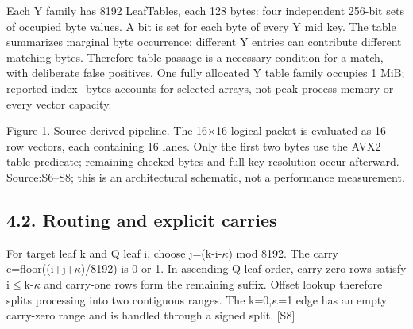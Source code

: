 \documentclass[10pt,letterpaper]{article}
\begin{document}
Each Y family has 8192 LeafTables, each 128 bytes: four independent 256-bit sets of occupied byte values. A bit is set for each byte of every Y mid key. The table summarizes marginal byte occurrence; different Y entries can contribute different matching bytes. Therefore table passage is a necessary condition for a match, with deliberate false positives. One fully allocated Y table family occupies 1 MiB; reported index\_bytes accounts for selected arrays, not peak process memory or every vector capacity.



\begin{center}
\end{center}


{\small\color{teal}Figure 1. Source-derived pipeline. The 16\ensuremath{\times}16 logical packet is evaluated as 16 row vectors, each containing 16 lanes. Only the first two bytes use the AVX2 table predicate; remaining checked bytes and full-key resolution occur afterward. Source:S6--S8; this is an architectural schematic, not a performance measurement.\par}

\subsection*{4.2. Routing and explicit carries}

For target leaf k and Q leaf i, choose j=(k-i-\ensuremath{\kappa}) mod 8192. The carry c=floor((i+j+\ensuremath{\kappa})/8192) is 0 or 1. In ascending Q-leaf order, carry-zero rows satisfy i\ensuremath{\leq}k-\ensuremath{\kappa} and carry-one rows form the remaining suffix. Offset lookup therefore splits processing into two contiguous ranges. The k=0,\ensuremath{\kappa}=1 edge has an empty carry-zero range and is handled through a signed split. [S8]
\end{document}
